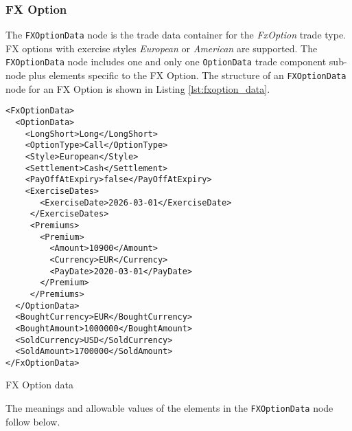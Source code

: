 \subsubsection{FX Option}

The \lstinline!FXOptionData! node is the trade data container for the \emph{FxOption} trade type. FX options with exercise styles \emph{European} or \emph{American} are supported. 
The \lstinline!FXOptionData! node includes one and only one \lstinline!OptionData! trade
component sub-node plus elements specific to the FX Option. The structure of an \lstinline!FXOptionData! node
for an FX Option is shown in Listing \ref{lst:fxoption_data}.

\begin{listing}[H]
\begin{verbatim}
<FxOptionData>
  <OptionData>
    <LongShort>Long</LongShort>
    <OptionType>Call</OptionType>
    <Style>European</Style>
    <Settlement>Cash</Settlement>
    <PayOffAtExpiry>false</PayOffAtExpiry>
    <ExerciseDates>
       <ExerciseDate>2026-03-01</ExerciseDate>
     </ExerciseDates>
     <Premiums>
       <Premium>
         <Amount>10900</Amount>
         <Currency>EUR</Currency>
         <PayDate>2020-03-01</PayDate>
       </Premium>
     </Premiums>
  </OptionData>
  <BoughtCurrency>EUR</BoughtCurrency>
  <BoughtAmount>1000000</BoughtAmount>
  <SoldCurrency>USD</SoldCurrency>
  <SoldAmount>1700000</SoldAmount>
</FxOptionData>
\end{verbatim}
\caption{FX Option data}
\label{lst:fxoption_data}
\end{listing}

The meanings and allowable values of the elements in the \lstinline!FXOptionData! node follow below.

